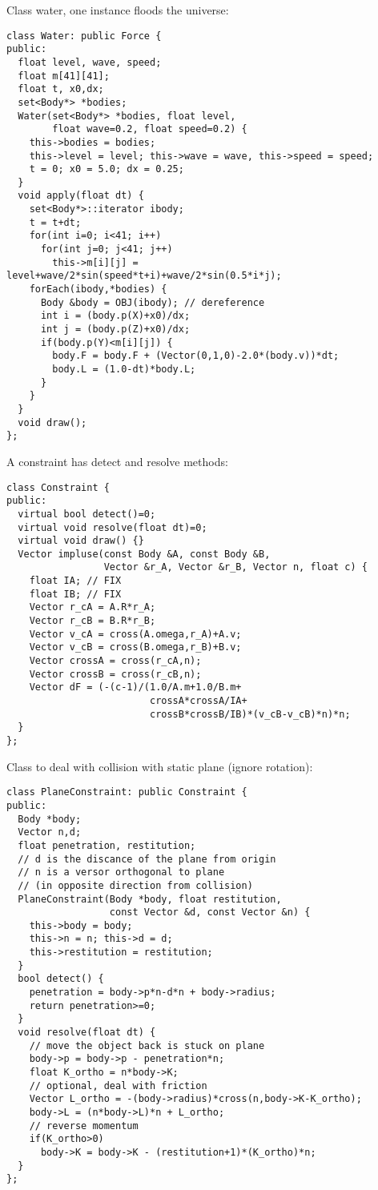 Class water, one instance floods the universe: \begin{lstlisting}
class Water: public Force {
public:
  float level, wave, speed;
  float m[41][41];
  float t, x0,dx;
  set<Body*> *bodies;
  Water(set<Body*> *bodies, float level,
        float wave=0.2, float speed=0.2) {
    this->bodies = bodies;
    this->level = level; this->wave = wave, this->speed = speed;
    t = 0; x0 = 5.0; dx = 0.25;
  }
  void apply(float dt) {
    set<Body*>::iterator ibody;
    t = t+dt;
    for(int i=0; i<41; i++)
      for(int j=0; j<41; j++)
        this->m[i][j] = level+wave/2*sin(speed*t+i)+wave/2*sin(0.5*i*j);
    forEach(ibody,*bodies) {
      Body &body = OBJ(ibody); // dereference
      int i = (body.p(X)+x0)/dx;
      int j = (body.p(Z)+x0)/dx;
      if(body.p(Y)<m[i][j]) {
        body.F = body.F + (Vector(0,1,0)-2.0*(body.v))*dt;
        body.L = (1.0-dt)*body.L;
      }
    }
  }
  void draw();
};
\end{lstlisting}
\noindent
A constraint has detect and resolve methods: \begin{lstlisting}
class Constraint {
public:
  virtual bool detect()=0;
  virtual void resolve(float dt)=0;
  virtual void draw() {}
  Vector impluse(const Body &A, const Body &B,
                 Vector &r_A, Vector &r_B, Vector n, float c) {
    float IA; // FIX
    float IB; // FIX
    Vector r_cA = A.R*r_A;
    Vector r_cB = B.R*r_B;
    Vector v_cA = cross(A.omega,r_A)+A.v;
    Vector v_cB = cross(B.omega,r_B)+B.v;
    Vector crossA = cross(r_cA,n);
    Vector crossB = cross(r_cB,n);
    Vector dF = (-(c-1)/(1.0/A.m+1.0/B.m+
                         crossA*crossA/IA+
                         crossB*crossB/IB)*(v_cB-v_cB)*n)*n;
  }
};
\end{lstlisting}
\noindent
Class to deal with collision with static plane
(ignore rotation): \begin{lstlisting}
class PlaneConstraint: public Constraint {
public:
  Body *body;
  Vector n,d;
  float penetration, restitution;
  // d is the discance of the plane from origin
  // n is a versor orthogonal to plane
  // (in opposite direction from collision)
  PlaneConstraint(Body *body, float restitution,
                  const Vector &d, const Vector &n) {
    this->body = body;
    this->n = n; this->d = d;
    this->restitution = restitution;
  }
  bool detect() {
    penetration = body->p*n-d*n + body->radius;
    return penetration>=0;
  }
  void resolve(float dt) {
    // move the object back is stuck on plane
    body->p = body->p - penetration*n;
    float K_ortho = n*body->K;
    // optional, deal with friction
    Vector L_ortho = -(body->radius)*cross(n,body->K-K_ortho);
    body->L = (n*body->L)*n + L_ortho;
    // reverse momentum
    if(K_ortho>0)
      body->K = body->K - (restitution+1)*(K_ortho)*n;
  }
};
\end{lstlisting}
